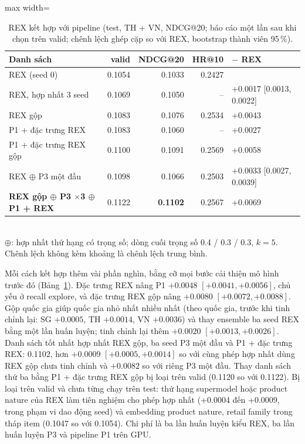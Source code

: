 \documentclass[jtehm]{ieeeaccess}
\begin{document}
\begin{table}[t]
\caption{REX kết hợp với pipeline (test, TH + VN, NDCG@20; báo cáo một lần sau khi chọn trên valid; chênh lệch ghép cặp so với
REX, bootstrap thành viên 95\,\%).}
\label{tab:hybrid}
\setlength{\tabcolsep}{3pt}
\centering
\begin{adjustbox}{max width=\columnwidth}
\begin{tabular}{lrrrl}
\toprule
Danh sách & valid & NDCG@20 & HR@10 & $-$ REX \\
\midrule
REX (seed 0)                                   & 0.1054 & 0.1033 & 0.2427 & \\
REX, hợp nhất 3 seed                           & 0.1069 & 0.1050 & --     & +0.0017 [0.0013, 0.0022] \\
REX gộp                                        & 0.1083 & 0.1076 & 0.2534 & +0.0043 \\
P1 + đặc trưng REX                             & 0.1083 & 0.1060 & --     & +0.0027 \\
P1 + đặc trưng REX gộp                         & 0.1100 & 0.1091 & 0.2569 & +0.0058 \\
REX $\oplus$ P3 một đầu                        & 0.1098 & 0.1066 & 0.2503 & +0.0033 [0.0027, 0.0039] \\
\textbf{REX gộp $\oplus$ P3 $\times$3 $\oplus$ P1 + REX} & 0.1122 & \textbf{0.1102} & 0.2567 & +0.0069 \\
\bottomrule
\end{tabular}
\end{adjustbox}
\\[1ex]
{\footnotesize $\oplus$: hợp nhất thứ hạng có trọng số; dòng cuối trọng số 0.4 / 0.3 / 0.3, $k = 5$. Chênh lệch không kèm khoảng là
chênh lệch trung bình.}
\end{table}

Mỗi cách kết hợp thêm vài phần nghìn, bằng cỡ mọi bước cải thiện mô hình trước đó (Bảng~\ref{tab:hybrid}). Đặc trưng REX nâng P1
$+0.0048$ $[+0.0041, +0.0056]$, chủ yếu ở recall explore, và đặc trưng REX gộp nâng $+0.0080$ $[+0.0072, +0.0088]$. Gộp quốc gia giúp
quốc gia nhỏ nhất nhiều nhất (theo quốc gia, trước khi tinh chỉnh lại: SG $+0.0005$, TH $+0.0014$, VN $+0.0036$) và thay ensemble
ba seed REX bằng một lần huấn luyện; tinh chỉnh lại thêm $+0.0020$ $[+0.0013, +0.0026]$. Danh sách tốt nhất hợp nhất REX gộp, ba
seed P3 một đầu và P1 + đặc trưng REX: 0.1102, hơn $+0.0009$ $[+0.0005, +0.0014]$ so với cùng phép hợp nhất dùng REX gộp chưa tinh
chỉnh và $+0.0082$ so với riêng P3 một đầu. Thay danh sách thứ ba bằng P1 + đặc trưng REX gộp bị loại trên valid (0.1120 so với
0.1122). Bị loại trên valid và chưa từng chạy trên test: thứ hạng supermodel hoặc product nature của REX làm tiên nghiệm cho phép hợp
nhất (+0.0004 đến +0.0009, trong phạm vi dao động seed) và embedding product nature, retail family trong tháp item (0.1047 so với
0.1054). Chi phí là ba lần huấn luyện kiểu REX, ba lần huấn luyện P3 và pipeline P1 trên GPU.
\end{document}
